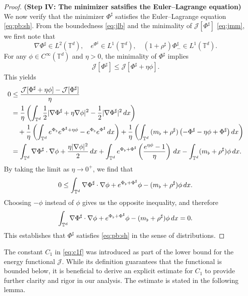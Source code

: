 \documentclass[11pt,reqno,a4paper]{amsart}
\newcommand{\intt}{\int_{\T^d}}
\theoremstyle{definition}
\theoremstyle{remark}
\numberwithin{equation}{section}
\newcommand{\T} {\mathbb T}
\newcommand{\lt}{\left}
\newcommand{\rt}{\right}
\newcommand{\calJ}{\mathcal J}
\newcommand{\dx}{\textnormal{d}x}
\begin{document}
\begin{proof}
\noindent\textbf{(Step IV: The minimizer satsifies the Euler--Lagrange equation)} We now verify that the minimizer $\Phi^\sharp$ satisfies the Euler--Lagrange equation \eqref{eq:pb:sh}. From the boundedness \eqref{eq:jlb} and the minimality of $\calJ[\Phi^\sharp]$ \eqref{eq:jmm}, we first note that
\[
\nabla \Phi^\sharp \in L^2(\T^d),\quad e^{\Phi^\sharp} \in L^{1}(\T^d),\quad \lt(1+\rho^\sharp\rt) \Phi^\sharp_- \in L^1(\T^d).
\]
For any $\phi \in C^\infty(\T^d)$ and $\eta>0$, the minimality of $\Phi^\sharp$ implies
\[
\calJ[\Phi^\sharp] \le \calJ[\Phi^\sharp + \eta \phi]. 
\]
This yields
\begin{align*}
0&\le \frac{\calJ[\Phi^\sharp + \eta \phi] - \calJ[\Phi^\sharp] }{\eta} \\
&= \frac{1}{\eta}\lt(\intt \frac{1}{2}|\nabla  \Phi^\sharp + \eta\nabla \phi|^2 - \frac{1}{2}|\nabla  \Phi^\sharp|^2\, \dx\rt) \\
&\quad + \frac{1}{\eta}\lt(\intt e^{\Phi_\flat}e^{ \Phi^\sharp+\eta \phi} -e^{\Phi_\flat}e^{ \Phi^\sharp}\,\dx \rt) + \frac{1}{\eta}\lt(\intt\, (m_\flat + \rho^\sharp) \lt(- \Phi^\sharp-\eta\phi +  \Phi^\sharp \rt)\dx\rt) \\
&= \intt \nabla \Phi^\sharp \cdot \nabla  \phi + \frac{\eta|\nabla \phi|^2}{2} \,\dx + \intt e^{\Phi_\flat+ \Phi^\sharp}\lt(\frac{e^{\eta\phi}-1}{\eta}\rt) \,\dx -\intt (m_\flat + \rho^\sharp)\phi\,\dx.
\end{align*}
By taking the limit as $\eta \to 0^+$, we find that
\[
0 \le \intt  \nabla\Phi^\sharp \cdot \nabla  \phi + e^{\Phi_\flat+ \Phi^\sharp} \phi - (m_\flat + \rho^\sharp)\phi\,\dx.
\]
Choosing $-\phi$ instead of $\phi$ gives us the opposite inequality, and therefore
\[
\intt  \nabla\Phi^\sharp \cdot \nabla  \phi + e^{\Phi_\flat+ \Phi^\sharp} \phi - (m_\flat + \rho^\sharp)\phi\,\dx=0.
\]
This establishes that $\Phi^\sharp$ satisfies \eqref{eq:pb:sh} in the sense of distributions.
\end{proof}

The constant $C_1$ in \eqref{eq:c1f} was introduced as part of the lower bound for the energy functional $\calJ$. While its definition guarantees that the functional is bounded below, it is beneficial to derive an explicit estimate for $C_1$ to provide further clarity and rigor in our analysis. The estimate is stated in the following lemma.
\end{document}
